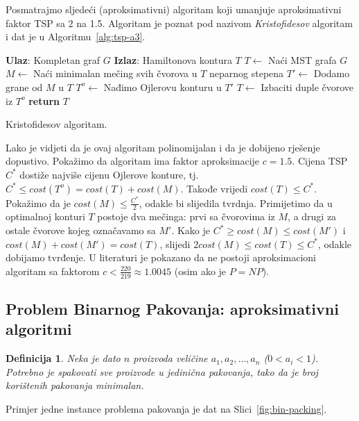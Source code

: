 \documentclass[a4paper, utf8, 11pt, colorlinks]{book}
\newtheorem{definition}{Definicija}
\begin{document}
Posmatrajmo sljedeći (aproksimativni) algoritam koji umanjuje aproksimativni faktor TSP sa $2$ na 1.5. Algoritam je poznat pod nazivom \emph{Kristofidesov} algoritam i dat je u Algoritmu~\ref{alg:tsp-a3}.

\begin{algorithm}[H] 

	\begin{algorithmic}[1]
		\STATE \textbf{Ulaz}: Kompletan graf $G$
		\STATE \textbf{Izlaz}: Hamiltonova kontura $T$ 
		\STATE $T \gets$ Naći MST grafa $G$
		\STATE $M \gets$ Naći minimalan mečing svih čvorova u $T$ neparnog stepena
		\STATE $T' \gets$ Dodamo grane od $M$ u $T$
		\STATE $T^o\gets$ Nađimo Ojlerovu konturu u $T'$
		\STATE $T \gets$ Izbaciti duple čvorove iz $T^o$
		\STATE \textbf{return} $T$
	\end{algorithmic}	
    \caption{Kristofidesov algoritam.}
    \label{alg:tsp-a3}
\end{algorithm}
  Lako je vidjeti da je ovaj algoritam polinomijalan i da je dobijeno rješenje dopustivo.
 Pokažimo da algoritam ima faktor aproksimacije $c=1.5$.  Cijena TSP $C^*$ dostiže najviše cijenu Ojlerove konture, tj.  $C^*\leq cost(T^o) = cost(T) + cost(M)$.  Takođe vrijedi $cost(T) \leq C^*$. Pokažimo da je $cost(M) \leq  \frac{C^*}{2}$, odakle bi slijedila tvrdnja. Primijetimo da u optimalnoj konturi $T$ postoje dva mečinga: prvi sa čvorovima iz $M$, a drugi za ostale čvorove kojeg označavamo sa $M'$. 
 Kako je $C^* \geq cost(M) \leq cost(M')$ i $cost(M) + cost(M') = cost(T)$, slijedi 
 $2 cost(M) \leq cost(T) \leq C^*$, odakle dobijamo tvrđenje.  U literaturi je pokazano da ne postoji  aproksimacioni algoritam sa faktorom  $c < \frac{220}{219} \approx 1.0045$ (osim ako je $P=NP$). 
 
 
 \subsection{Problem Binarnog Pakovanja: aproksimativni algoritmi}

\begin{definition}
    Neka je dato $n$ proizvoda veličine $a_1,a_2,\ldots,a_n$ ($0<a_i<1$). Potrebno je spakovati sve proizvode u jedinična pakovanja, tako da je broj korištenih pakovanja minimalan.  
\end{definition} 

  Primjer jedne instance problema pakovanja je dat na Slici~\ref{fig:bin-packing}.
\end{document}
